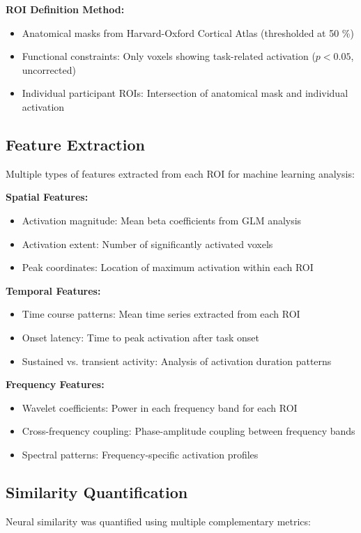 \noindent
\textbf{ROI Definition Method:}
\begin{itemize}
\item Anatomical masks from Harvard-Oxford Cortical Atlas (thresholded at 50 \%)
\item Functional constraints: Only voxels showing task-related activation ($p < 0.05$, uncorrected)
\item Individual participant ROIs: Intersection of anatomical mask and individual activation
\end{itemize}


\subsection{Feature Extraction}
Multiple types of features extracted from each ROI for machine learning analysis:

\vspace{0.5\baselineskip}
\noindent
\textbf{Spatial Features:}
\begin{itemize}
\item Activation magnitude: Mean beta coefficients from GLM analysis
\item Activation extent: Number of significantly activated voxels
\item Peak coordinates: Location of maximum activation within each ROI
\end{itemize}

\noindent
\textbf{Temporal Features:}
\begin{itemize}
\item Time course patterns: Mean time series extracted from each ROI
\item Onset latency: Time to peak activation after task onset
\item Sustained vs. transient activity: Analysis of activation duration patterns
\end{itemize}

\noindent
\textbf{Frequency Features:}
\begin{itemize}
\item Wavelet coefficients: Power in each frequency band for each ROI
\item Cross-frequency coupling: Phase-amplitude coupling between frequency bands
\item Spectral patterns: Frequency-specific activation profiles
\end{itemize}


\subsection{Similarity Quantification}
Neural similarity was quantified using multiple complementary metrics:

